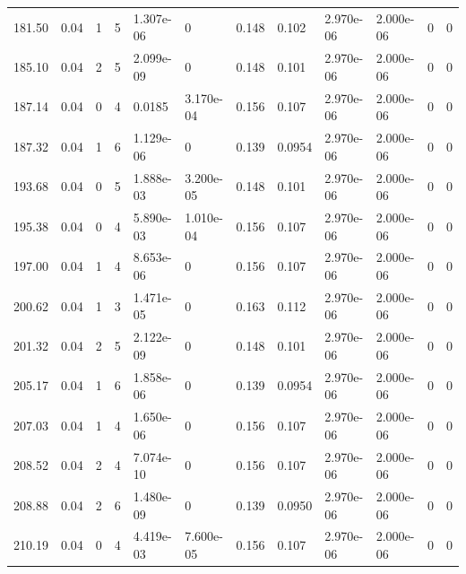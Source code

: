 \documentclass[preview]{standalone}
\begin{document}
{{{\begin{tabular}{L{1.2cm}C{1.2cm} C{0.3cm}C{0.5cm} C{1.4cm}C{1.4cm} C{1.4cm}C{1.4cm} C{1.6cm}C{1.6cm} C{1.6cm}C{1.6cm}}
  181.50  &  0.04  & 1     &  5 &  1.307e-06  & 0  &  0.148&   0.102& 2.970e-06 & 2.000e-06   &  0 & 0  \\ 
  185.10  &  0.04  & 2     &  5 &  2.099e-09  & 0  &  0.148&   0.101& 2.970e-06 & 2.000e-06   &  0 & 0  \\ 
  187.14  &  0.04  & 0     &  4 &  0.0185  & 3.170e-04  &  0.156&   0.107& 2.970e-06 & 2.000e-06   &  0 & 0  \\ 
  187.32  &  0.04  & 1     &  6 &  1.129e-06  & 0  &  0.139&   0.0954& 2.970e-06 & 2.000e-06   &  0 & 0  \\ 
  193.68  &  0.04  & 0     &  5 &  1.888e-03  & 3.200e-05  &  0.148&   0.101& 2.970e-06 & 2.000e-06   &  0 & 0  \\ 
  195.38  &  0.04  & 0     &  4 &  5.890e-03  & 1.010e-04  &  0.156&   0.107& 2.970e-06 & 2.000e-06   &  0 & 0  \\ 
  197.00  &  0.04  & 1     &  4 &  8.653e-06  & 0  &  0.156&   0.107& 2.970e-06 & 2.000e-06   &  0 & 0  \\ 
  200.62  &  0.04  & 1     &  3 &  1.471e-05  & 0  &  0.163&   0.112& 2.970e-06 & 2.000e-06   &  0 & 0  \\ 
  201.32  &  0.04  & 2     &  5 &  2.122e-09  & 0  &  0.148&   0.101& 2.970e-06 & 2.000e-06   &  0 & 0  \\ 
  205.17  &  0.04  & 1     &  6 &  1.858e-06  & 0  &  0.139&   0.0954& 2.970e-06 & 2.000e-06   &  0 & 0  \\ 
  207.03  &  0.04  & 1     &  4 &  1.650e-06  & 0  &  0.156&   0.107& 2.970e-06 & 2.000e-06   &  0 & 0  \\ 
  208.52  &  0.04  & 2     &  4 &  7.074e-10  & 0  &  0.156&   0.107& 2.970e-06 & 2.000e-06   &  0 & 0  \\ 
  208.88  &  0.04  & 2     &  6 &  1.480e-09  & 0  &  0.139&   0.0950& 2.970e-06 & 2.000e-06   &  0 & 0  \\ 
  210.19  &  0.04  & 0     &  4 &  4.419e-03  & 7.600e-05  &  0.156&   0.107& 2.970e-06 & 2.000e-06   &  0 & 0  \\ 
\hline 
\end{tabular} 

}}}
\end{document}
